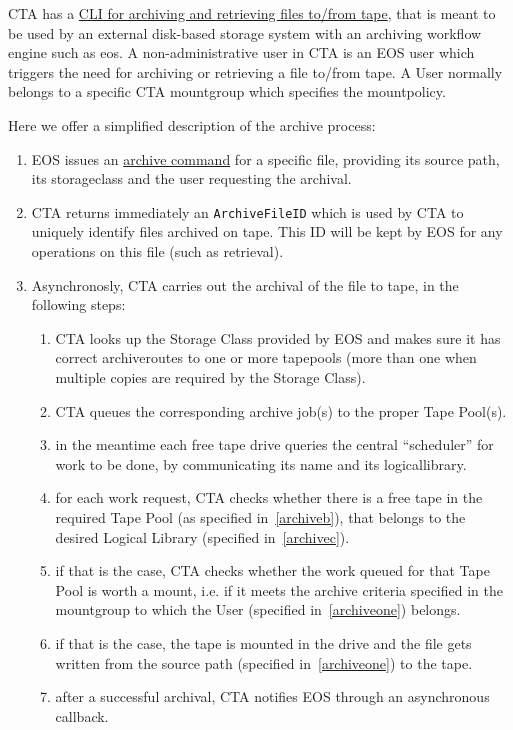 CTA has a \hyperref[ctaeoscli]{CLI for archiving and retrieving files to\slash from tape}, that is meant to be used by an
external disk-based storage system with an archiving workflow engine such as \gls{eos}. A non-administrative \gls{user} in CTA is an EOS user
which triggers the need for archiving or retrieving a file to/from tape. A User normally belongs to a specific CTA
\gls{mountgroup} which specifies the \gls{mountpolicy}.

Here we offer a simplified description of the archive process:

\begin{enumerate}
\item EOS issues an \hyperref[ctaeosarchive]{archive command} for a specific file, providing its source path, its
      \gls{storageclass} and the \gls{user} requesting the archival.\label{archiveone}
\item CTA returns immediately an {\tt ArchiveFileID} which is used by CTA to uniquely identify files archived on tape.
      This ID will be kept by EOS for any operations on this file (such as retrieval).
\item Asynchronosly, CTA carries out the archival of the file to tape, in the following steps:
\begin{enumerate}
   \item CTA looks up the Storage Class provided by EOS and makes sure it has correct \glspl{archiveroute} to one or more
         \glspl{tapepool} (more than one when multiple copies are required by the Storage Class).
   \item CTA queues the corresponding archive job(s) to the proper Tape Pool(s).\label{archiveb}
   \item in the meantime each free tape drive queries the central ``scheduler'' for work to be done, by communicating
         its name and its \gls{logicallibrary}\label{archivec}.
   \item for each work request, CTA checks whether there is a free tape in the required Tape Pool (as specified
         in~\ref{archiveb}), that belongs to the desired Logical Library (specified in~\ref{archivec}).
   \item if that is the case, CTA checks whether the work queued for that Tape Pool is worth a mount, i.e. if it meets
         the archive criteria specified in the \gls{mountgroup} to which the User (specified in~\ref{archiveone}) belongs.
   \item if that is the case, the tape is mounted in the drive and the file gets written from the source path
         (specified in~\ref{archiveone}) to the tape.
   \item after a successful archival, CTA notifies EOS through an asynchronous callback.
\end{enumerate}
\end{enumerate}

